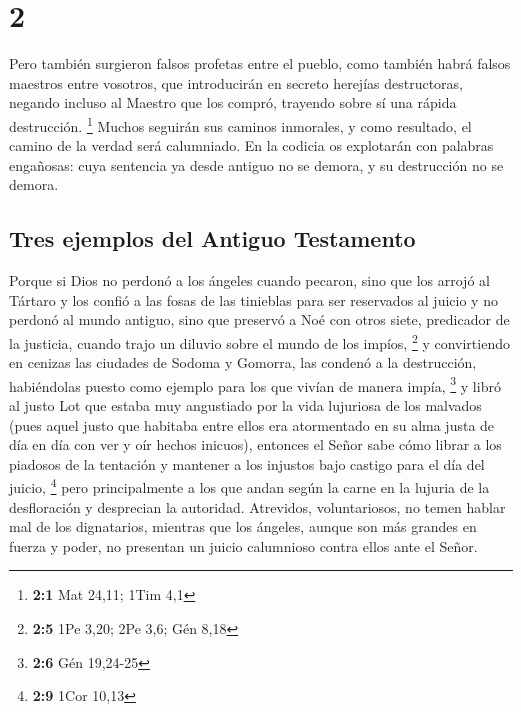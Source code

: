 \hypertarget{section-1}{%
\section{2}\label{section-1}}

 Pero también surgieron falsos profetas entre el pueblo,
como también habrá falsos maestros entre vosotros, que introducirán en
secreto herejías destructoras, negando incluso al Maestro que los
compró, trayendo sobre sí una rápida destrucción. \footnote{\textbf{2:1}
  Mat 24,11; 1Tim 4,1}  Muchos seguirán sus caminos
inmorales, y como resultado, el camino de la verdad será calumniado.
 En la codicia os explotarán con palabras engañosas: cuya
sentencia ya desde antiguo no se demora, y su destrucción no se demora.

\hypertarget{tres-ejemplos-del-antiguo-testamento}{%
\subsection{Tres ejemplos del Antiguo
Testamento}\label{tres-ejemplos-del-antiguo-testamento}}

 Porque si Dios no perdonó a los ángeles cuando pecaron,
sino que los arrojó al Tártaro y los confió a las fosas de las tinieblas
para ser reservados al juicio  y no perdonó al mundo
antiguo, sino que preservó a Noé con otros siete, predicador de la
justicia, cuando trajo un diluvio sobre el mundo de los impíos,
\footnote{\textbf{2:5} 1Pe 3,20; 2Pe 3,6; Gén 8,18}  y
convirtiendo en cenizas las ciudades de Sodoma y Gomorra, las condenó a
la destrucción, habiéndolas puesto como ejemplo para los que vivían de
manera impía, \footnote{\textbf{2:6} Gén 19,24-25}  y
libró al justo Lot que estaba muy angustiado por la vida lujuriosa de
los malvados  (pues aquel justo que habitaba entre ellos
era atormentado en su alma justa de día en día con ver y oír hechos
inicuos),  entonces el Señor sabe cómo librar a los
piadosos de la tentación y mantener a los injustos bajo castigo para el
día del juicio, \footnote{\textbf{2:9} 1Cor 10,13}  pero
principalmente a los que andan según la carne en la lujuria de la
desfloración y desprecian la autoridad. Atrevidos, voluntariosos, no
temen hablar mal de los dignatarios,  mientras que los
ángeles, aunque son más grandes en fuerza y poder, no presentan un
juicio calumnioso contra ellos ante el Señor.

